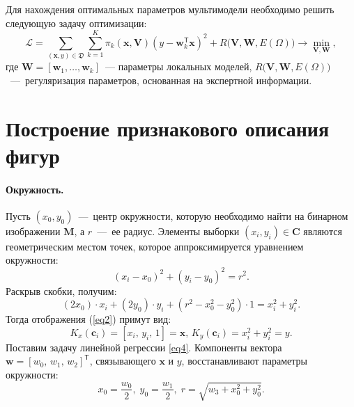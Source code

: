 \documentclass[12pt, twoside]{article}
\numberwithin{equation}{section}
\begin{document}
Для нахождения оптимальных параметров мультимодели необходимо решить следующую задачу оптимизации:
\begin{equation}\label{9}
\mathcal{L} = \sum\limits_{(\mathbf{x}, y) \in \mathfrak{D}} \sum\limits_{k = 1}^{K} \pi_k(\mathbf{x}, \mathbf{V})(y - \mathbf{w}_k^{\mathsf{T}}\mathbf{x})^2 + R\bigl(\mathbf{V}, \mathbf{W}, E(\Omega)\bigr) \rightarrow \min_{\mathbf{V}, \mathbf{W}},
\end{equation}
где $\mathbf{W} = [\mathbf{w}_1, \dots, \mathbf{w}_k]$~--- параметры локальных моделей, $R\bigl(\mathbf{V}, \mathbf{W}, E(\Omega)\bigr)$~---~регуляризация параметров, основанная на экспертной информации.

\section{Построение признакового описания фигур}
\paragraph{Окружность.}
Пусть $(x_0, y_0)$~---~центр окружности, которую необходимо найти на бинарном изображении $\mathbf{M}$, а $r$~---~ее радиус. Элементы выборки $(x_i, y_i) \in \mathbf{C}$ являются геометрическим местом точек, которое аппроксимируется уравнением окружности:
\begin{equation}
(x_i - x_0)^2 + (y_i - y_0)^2 = r^2.
\end{equation}
Раскрыв скобки, получим:
\begin{equation}(2x_0)\cdot x_i + (2y_0)\cdot y_i + (r^2 - x_0^2 - y_0^2)\cdot 1 = x_i^2 + y_i^2 . 
\end{equation}
Тогда отображения (\ref{eq2}) примут вид:
\begin{equation}
\label{10}
K_{x}(\mathbf{c}_i) = [x_i, \, y_i, \, 1] = \mathbf{x}, \,  K_{y}(\mathbf{c}_i) = x_i^2+y_i^2 = y.
\end{equation} 
Поставим задачу линейной регрессии \eqref{eq4}.
Компоненты вектора $\mathbf{w} = [w_0, \, w_1, \, w_2]^\mathsf{T}$, связывающего $\mathbf{x}$ и $y$, восстанавливают параметры окружности: \begin{equation} x_0 = \frac{w_0}{2}, \; y_0 = \frac{w_1}{2}, \; r = \sqrt{w_3 + x_0^2 + y_0 ^2}.\end{equation}
\end{document}
